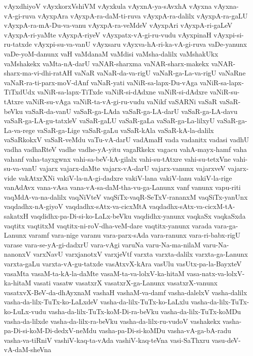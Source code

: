 {vAyxdhiyoV
vAyxkorxVshiVM
vAyxkula
vAyxnA-ya-sAvxhA
vAyxna
vAyxna-vA-gi-ruva
vAyxpAra
vAyxpA-ra-daM-ti-ruva
vAyxpA-ra-dalilx
vAyxpA-ra-gaLU
vAyxpA-ra-mA-Du-va-vanu
vAyxpA-ra-veMdeV
vAyxpAri
vAyxpA-ri-gaLeV
vAyxpA-ri-yaMte
vAyxpA-riyeV
vAyxpatx-vA-gi-ru-vudu
vAyxpinaH
vAyxpi-si-ru-tatxde
vAyxpi-su-va-vanU
vAyxsaru
vAyxva-hA-ri-ka-vA-gi-ruva
vaDe-yanunx
vaDe-yoM-danunx
vaH
vaMdanaM
vaMdisi
vaMsha-dalilx
vaMshakUkx
vaMshakekx
vaMta-nA-darU
vaNAR-sharxma
vaNAR-sharx-makekx
vaNAR-sharx-ma-vi-dhi-ratAH
vaNaR
vaNaR-da-va-rigU
vaNaR-ga-La-va-rigU
vaNaRne
vaNaR-ra-ti-parx-moV-dAnf
vaNaR-yati
vaNiR-sa-lapx-Du-vAga
vaNiR-sa-lapx-TiTxdUdx
vaNiR-sa-lapx-TiTxde
vaNiR-si-dAdxne
vaNiR-si-dAdxre
vaNiR-su-tAtxre
vaNiR-su-vAga
vaNiR-ta-vA-gi-ru-vudu
vaNikf
vaSARNi
vaSaR
vaSaR-beVku
vaSaR-da-vanU
vaSaR-ga-LAda
vaSaR-ga-LA-darU
vaSaR-ga-LA-davu
vaSaR-ga-LA-gu-tatxleV
vaSaR-gaLU
vaSaR-gaLa
vaSaR-ga-La-lilxyU
vaSaR-ga-La-va-rege
vaSaR-ga-Lige
vaSaR-gaLu
vaSaR-kAla
vaSaR-kA-la-dalilx
vaSaRkokxV
vaSaR-veMdu
vaTu-vA-darU
vadAmaH
vada
vadanitx
vadasi
vadhU
vadha
vadhaRteV
vadhe
vadhe-yA-yitu
vagaRkekx
vagacu
vahA-mayx-hamf
vaha
vahanf
vaha-tayxgwnx
vahi-sa-beV-kA-gilalx
vahi-su-tAtxre
vahi-su-tetxVne
vahi-su-va-vanU
vajarx
vajarx-daMte
vajarx-vA-darU
vajarx-vanunx
vajarxveV
vajarx-vide
vakAtxrXNi
vakiV-la-nA-gi-dadxre
vakiV-lana
vakiV-lanu
vakiV-la-rige
vanAdAvx
vana-vAsa
vana-vA-sa-daM-tha-vu-ga-Lanunx
vanf
vanunx
vapu-riti
vaqMdA-va-na-dalilx
vaqNiVteV
vaqSiTx-vaqR-SeTxV-rananxM
vaqSiTx-yanUnx
vaqdadhx-nA-giyoV
vaqdadhx-sAtx-va-cicxMtA
vaqdadhx-sAtx-va-cicxM-tA-sakatxH
vaqdidhx-pa-Di-si-ko-LaLx-beVku
vaqdidhx-yanunx
vaqkaSx
vaqkaSxda
vaqtitx
vaqtitxM
vaqtitx-ni-roV-dha-veM-dare
vaqtitx-yanunx
varada
vara-ga-Lanunx
varamf
vara-nige
varanu
vara-parx-sAda
vara-ranunx
vara-ri-babx-rigU
varase
vara-se-yA-gi-dadxrU
vara-vAgi
varuNa
varu-Na-ma-nilaM
varu-Na-nanonxV
varxNavU
varxjanotxV
varxjeVtf
varxta
varxta-dalilx
varxta-ga-Lanunx
varxta-gaLu
varxta-vA-gu-tatxde
vasAtxvX-kAra
vasUlu
vasUtx-pa-la-BayxteV
vasaMta
vasaM-ta-kA-la-daMte
vasaM-ta-va-lolxV-ka-hitaM
vasa-natx-va-lolxV-ka-hitaM
vasati
vasatw
vasatxrX
vasatxrX-ga-Lanunx
vasatxrX-vanunx
vasatxvX-BeV-da-dhAyxnaM
vashaH
vashaM-va-damf
vasha-dalelxV
vasha-dalilx
vasha-da-lilx-TuTx-ko-LaLxdeV
vasha-da-lilx-TuTx-ko-LaLxlu
vasha-da-lilx-TuTx-ko-LuLx-vudu
vasha-da-lilx-TuTx-koM-Di-ra-beVku
vasha-da-lilx-TuTx-koMDu
vasha-da-lilxde
vasha-da-lilx-ra-beVku
vasha-da-lilx-ru-vudoV
vashakekx
vasha-pa-Di-si-koM-Di-dedxV-neMdu
vasha-pa-Di-si-koMDu
vasha-vA-ga-bA-radu
vasha-va-tiRniV
vashiV-kaq-ta-vAda
vashiV-kaq-teVna
vasi-SaThxru
vasu-deV-vA-daM-sheVna
}

